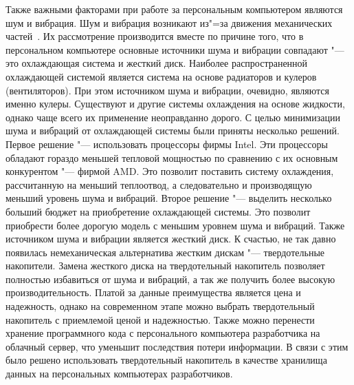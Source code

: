 Также важными факторами при работе за персональным компьютером являются шум и вибрация.
Шум и вибрация возникают из"=за движения механических частей~\cite{michnuk_2009}.
Их рассмотрение производится вместе по причине того, что в персональном компьютере основные источники шума и вибрации совпадают "--- это охлаждающая система и жесткий диск.
Наиболее распространенной охлаждающей системой является система на основе радиаторов и кулеров (вентиляторов).
При этом источником шума и вибрации, очевидно, являются именно кулеры.
Существуют и другие системы охлаждения на основе жидкости, однако чаще всего их применение неоправданно дорого.
С целью минимизации шума и вибраций от охлаждающей системы были приняты несколько решений.
Первое решение "--- использовать процессоры фирмы Intel. Эти процессоры обладают гораздо меньшей тепловой мощностью по сравнению с их основным конкурентом "--- фирмой AMD.
Это позволит поставить систему охлаждения, рассчитанную на меньший теплоотвод, а следовательно и производящую меньший уровень шума и вибраций.
Второе решение "--- выделить несколько больший бюджет на приобретение охлаждающей системы. Это позволит приобрести более дорогую модель с меньшим уровнем шума и вибраций.
Также источником шума и вибрации является жесткий диск.
К счастью, не так давно появилась немеханическая альтернатива жестким дискам "--- твердотельные накопители.
Замена жесткого диска на твердотельный накопитель позволяет полностью избавиться от шума и вибраций, а так же получить более высокую производительность.
Платой за данные преимущества является цена и надежность, однако на современном этапе можно выбрать твердотельный накопитель с приемлемой ценой и надежностью.
Также можно перенести хранение программного кода с персонального компьютера разработчика на облачный сервер, что уменьшит последствия потери информации.
В связи с этим было решено использовать твердотельный накопитель в качестве хранилища данных на персональных компьютерах разработчиков.

